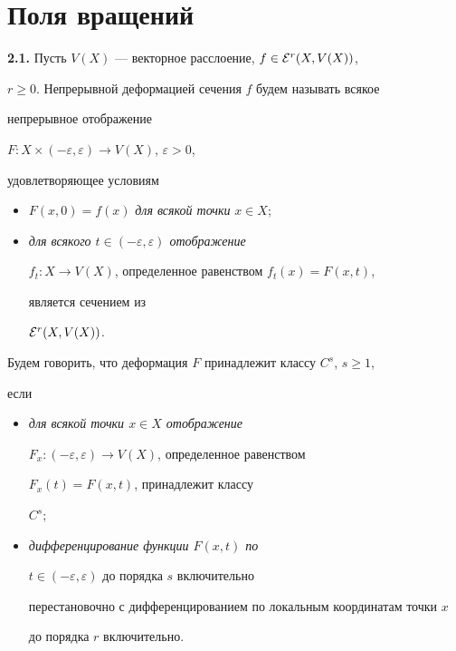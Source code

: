 \section{Поля вращений}





{\bf 2.1.} Пусть $V(X)$ --- векторное расслоение, $f\in {\cal E}^r(X,V(X))$,


$r\ge0$. Непрерывной деформацией сечения $f$ будем называть всякое


непрерывное отображение


$F: X\times (-\varepsilon,\varepsilon)\to V(X)$, $\varepsilon> 0$,


удовлетворяющее условиям


\begin{itemize}


\item[{\bf a)}] $F(x,0)=f(x)$ {\it для всякой точки} $x\in X$;\\


\item[{\bf б)}] {\it для всякого $t\in (-\varepsilon,\varepsilon)$ отображение


$f_t: X\to V(X)$, определенное равенством $f_t(x)= F(x,t)$,


является сечением из} ${\cal E}^r(X,V(X))$.


\end{itemize}





Будем говорить, что деформация $F$ принадлежит классу $C^s$, $s\ge1$,


если


\begin{itemize}


\item[{\bf в)}] {\it для всякой точки $x\in X$ отображение


$F_x: (-\varepsilon,\varepsilon)\to V(X)$, определенное равенством


$F_x(t)=F(x,t)$, принадлежит классу} $C^s$;\\


\item[{\bf г)}] {\it дифференцирование функции $F(x,t)$ по


$t\in (-\varepsilon,\varepsilon)$ до порядка $s$ включительно


перестановочно с дифференцированием по локальным координатам точки $x$


до порядка $r$ включительно.}


\end{itemize}





